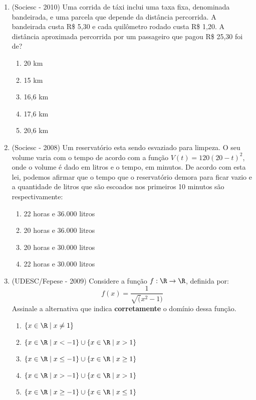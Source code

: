\begin{enumerate}
 \item (Sociesc - 2010) Uma corrida de táxi inclui uma taxa fixa, denominada bandeirada, e uma parcela que depende da distância percorrida. A bandeirada custa R\$ 5,30 e cada quilômetro rodado custa R\$ 1,20. A distância aproximada percorrida por um passageiro que pagou R\$ 25,30 foi de?
  \begin{enumerate}
  \item 20 km
  \item 15 km
  \item 16,6 km
  \item 17,6 km
  \item 20,6 km
 \end{enumerate}

  \item (Sociesc - 2008) Um reservatório esta sendo esvaziado para limpeza. O seu volume varia com o tempo de acordo com a função $V(t)= 120(20 - t)^2$, onde o volume é dado em litros e o tempo, em minutos. De acordo com esta lei, podemos afirmar que o tempo que o reservatório demora para ficar vazio e a quantidade de litros que são escoados nos primeiros 10 minutos são respectivamente:
  \begin{enumerate}
  \item 22 horas e 36.000 litros
  \item 20 horas e 36.000 litros
  \item 20 horas e 30.000 litros
  \item 22 horas e 30.000 litros
 \end{enumerate}

 \item (UDESC/Fepese - 2009) Considere a função $f: \R \to \R$, definida por:
 \[f(x)= \frac{1}{\sqrt(x^2 - 1)}\]
 Assinale a alternativa que indica \textbf{corretamente} o domínio dessa função.
 \begin{enumerate}
 \item $\{x \in \R \mid x \neq 1\}$
 \item $\{x \in \R \mid x < -1\} \cup \{x \in \R \mid x>1\}$
 \item $\{x \in \R \mid x \leq -1\} \cup \{x \in \R \mid x \geq 1\}$
 \item $\{x \in \R \mid x > -1\} \cup \{x \in \R \mid x>1\}$
 \item $\{x \in \R \mid x \geq -1\} \cup \{x \in \R \mid x\leq 1\}$

 \end{enumerate}

 \end{enumerate}

